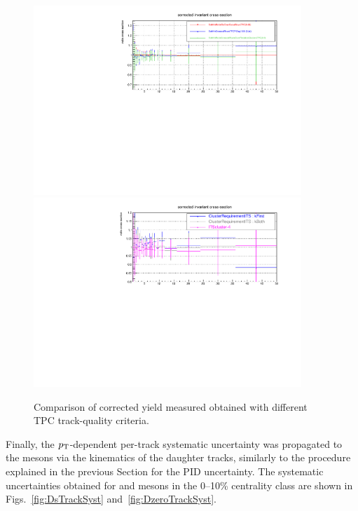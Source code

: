 \begin{figure}[tb]
\begin{center}
 \includegraphics[width=0.9\textwidth]{figures/Dstar/pp13TeV/corrected-yield-ratio-tracking-Dstar-D0-single-track.pdf}
 \includegraphics[width=0.9\textwidth]{figures/Dstar/pp13TeV/tracking-soft-pion-ratio-cross-section.pdf}
\caption{Comparison of \Dstar corrected yield measured obtained with different TPC track-quality criteria.}
\label{fig:TrackVariations}
\end{center}
\end{figure}

Finally, the $p_{\rm T}$-dependent per-track systematic uncertainty was propagated to the \Dsubs mesons via the kinematics of the \Dsubs daughter tracks, similarly to the procedure explained in the previous Section for the PID uncertainty. The systematic uncertainties obtained for \Dsubs and \Dzero mesons in the 0--10\% centrality class are shown in Figs.~\ref{fig:DsTrackSyst} and~\ref{fig:DzeroTrackSyst}.


